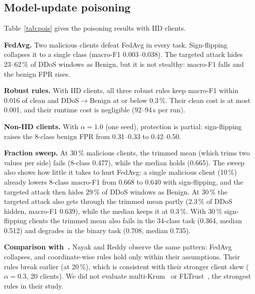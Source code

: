 \documentclass[conference]{IEEEtran}
\begin{document}
\subsection{Model-update poisoning}\label{sec:pois}
Table~\ref{tab:pois} gives the poisoning results with IID clients.

\textbf{FedAvg.} Two malicious clients defeat FedAvg in every task. Sign-flipping collapses it to a single class (macro-F1 0.003--0.038). The targeted attack hides 23--62\,\% of DDoS windows as Benign, but it is not stealthy: macro-F1 falls and the benign FPR rises.

\textbf{Robust rules.} With IID clients, all three robust rules keep macro-F1 within 0.016 of clean and DDoS$\rightarrow$Benign at or below 0.3\,\%. Their clean cost is at most 0.001, and their runtime cost is negligible (92--94\,s per run).

\textbf{Non-IID clients.} With $\alpha=1.0$ (one seed), protection is partial: sign-flipping raises the 8-class benign FPR from 0.31--0.33 to 0.42--0.50.

\textbf{Fraction sweep.} At 30\,\% malicious clients, the trimmed mean (which trims two values per side) fails (8-class 0.477), while the median holds (0.665). The sweep also shows how little it takes to hurt FedAvg: a single malicious client (10\,\%) already lowers 8-class macro-F1 from 0.668 to 0.640 with sign-flipping, and the targeted attack then hides 29\,\% of DDoS windows as Benign. At 30\,\% the targeted attack also gets through the trimmed mean partly (2.3\,\% of DDoS hidden, macro-F1 0.639), while the median keeps it at 0.3\,\%. With 30\,\% sign-flipping clients the trimmed mean also fails in the 34-class task (0.364, median 0.512) and degrades in the binary task (0.708, median 0.735).

\textbf{Comparison with~\cite{nayak2026byzantine}.} Nayak and Reddy observe the same pattern: FedAvg collapses, and coordinate-wise rules hold only within their assumptions. Their rules break earlier (at 20\,\%), which is consistent with their stronger client skew ($\alpha=0.3$, 20 clients). We did not evaluate multi-Krum~\cite{blanchard2017krum} or FLTrust~\cite{cao2021fltrust}, the strongest rules in their study.
\end{document}
